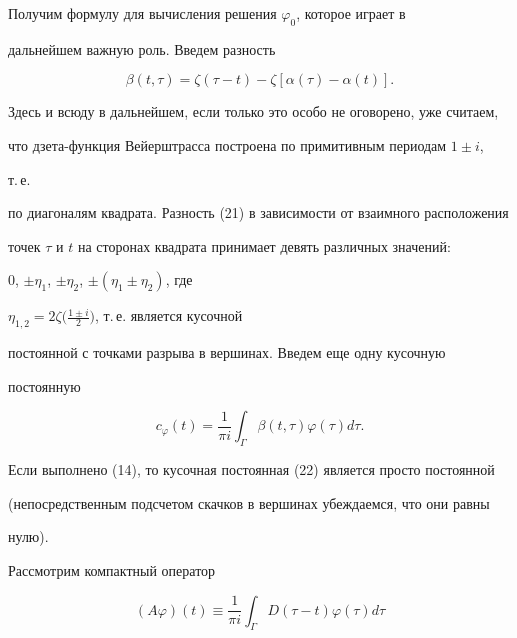  


 


Получим формулу для вычисления решения $\varphi_0$, которое играет в 


дальнейшем важную роль. Введем разность 


\begin{equation} 


\beta(t,\tau)=\zeta(\tau-t)-\zeta[\alpha(\tau)-\alpha(t)]. 


\end{equation} 


Здесь и всюду в дальнейшем, если только это особо не оговорено, уже считаем, 


что дзета-функция Вейерштрасса построена по примитивным периодам $1\pm i$, 


т.\,е. 


по диагоналям квадрата. Разность (21) в зависимости от взаимного расположения 


точек $\tau$ и $t$ на сторонах квадрата принимает девять различных значений: 


$0$, $\pm\eta_1$, $\pm\eta_2$, $\pm(\eta_1\pm\eta_2)$, где 


$\eta_{1,2}=2\zeta\big(\frac{1\pm i}{2}\big)$, т.\,е. является кусочной 


постоянной с точками разрыва в вершинах. Введем еще одну кусочную 


постоянную 


\begin{equation} 


c_\varphi(t)=\frac{1}{\pi i}\int_\Gamma \beta(t,\tau)\varphi(\tau)d\tau. 


\end{equation} 


Если выполнено (14), то кусочная постоянная (22) является просто постоянной 


(непосредственным подсчетом скачков в вершинах убеждаемся, что они равны 


нулю). 


 


Рассмотрим компактный оператор 


\begin{equation} 


(A\varphi)(t)\equiv\frac{1}{\pi i}\int_\Gamma 


D(\tau-t)\varphi(\tau)d\tau 


\end{equation} 


